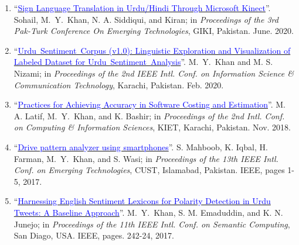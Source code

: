 \documentclass[a4paper, 10pt]{article}
\begin{document}
\begin{enumerate}
\item ``\href{https://dpi.org/10.1088/1757-899x/899/1/012016}{\textcolor{blue}{Sign Language Translation in Urdu/Hindi Through Microsoft Kinect}}''. Sohail, \textcolor{NavyBlue}{M.~Y.~Khan}, N. A. Siddiqui, and Kiran; in \emph{Proceedings of the 3rd Pak-Turk Conference On Emerging Technologies}, GIKI, Pakistan. June. 2020.

\item ``\href{https://doi.org/10.1109/ICISCT49550.2020.9080043}{\textcolor{blue}{Urdu~Sentiment~Corpus (v1.0): Linguistic Exploration and Visualization of Labeled Dataset for Urdu~Sentiment~Analysis}}''. \textcolor{NavyBlue}{M.~Y.~Khan} and M. S. Nizami; in \emph{Proceedings of the 2nd IEEE Intl. Conf. on Information Science \& Communication Technology}, Karachi, Pakistan. Feb. 2020.

\item ``\href{http://kjcis.pafkiet.edu.pk/index.php/kjcis/article/view/13}{\textcolor{blue}{Practices for Achieving Accuracy in Software Costing and Estimation}}''. M. A. Latif, \textcolor{NavyBlue}{M.~Y.~Khan}, and K. Bashir; in \emph{Proceedings of the 2nd Intl. Conf. on Computing \& Information Sciences}, KIET, Karachi, Pakistan. Nov. 2018.

\item ``\href{https://doi.org/10.1109/ICET.2017.8281659}{\textcolor{blue}{Drive pattern analyzer using smartphones}}''. S. Mahboob, K. Iqbal, H. Farman, \textcolor{NavyBlue}{M.~Y.~Khan}, and S. Wasi; in \emph{ Proceedings of the 13th IEEE Intl. Conf. on Emerging Technologies}, CUST, Islamabad, Pakistan. IEEE, pages 1-5, 2017.

\item ``\href{https://doi.org/10.1109/ICSC.2017.68}{\textcolor{blue}{Harnessing English Sentiment Lexicons for Polarity Detection in Urdu Tweets: A Baseline Approach}}''. \textcolor{NavyBlue}{M.~Y.~Khan}, S. M. Emaduddin, and K. N. Junejo; in \emph{Proceedings of the 11th IEEE Intl. Conf. on Semantic Computing}, San Diago, USA. IEEE, pages. 242-24, 2017.
\end{enumerate}
\end{document}
